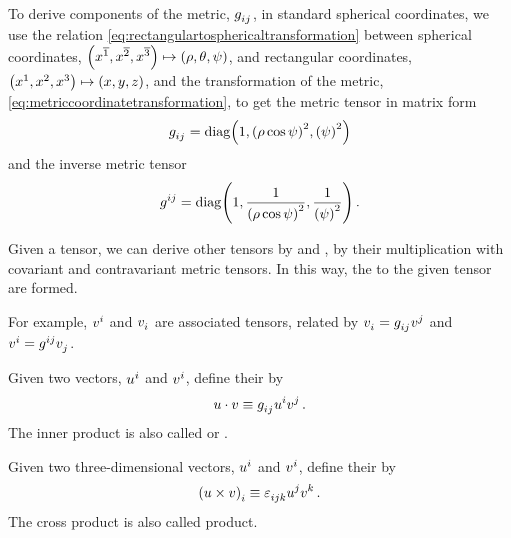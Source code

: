 \begin{example}
  To derive components of the metric, $\tcovmet ij$, in standard spherical coordinates, we use the relation \cref{eq:rectangulartosphericaltransformation} between spherical coordinates, $\tuple{\atvec\pos 1, \atvec\pos 2, \atvec\pos 3}\mapsto \tuple{\sxpos,\sypos,\szpos}$, and rectangular coordinates, $\tuple{\tvec\pos 1, \tvec\pos 2, \tvec\pos 3}\mapsto\tuple{\xpos,\ypos,\zpos}$, and the transformation of the metric, \cref{eq:metriccoordinatetransformation}, to get the metric tensor in matrix form
  \begin{equation}\label{eq:sphericalcoordinatemetric}
    \tcovmet ij = \diag\parens{1, \parens{\sxpos\cos\szpos}^2, \parens{\szpos}^2}
  \end{equation}
  and the inverse metric tensor
  \begin{equation}\label{eq:sphericalcoordinateinversemetric}
    \tvecmet ij = \diag\parens{1, \dfrac{1}{\parens{\sxpos\cos\szpos}^2}, \dfrac{1}{\parens{\szpos}^2}} \,.
  \end{equation}
\end{example}

\begin{definition}
  Given a tensor, we can derive other tensors by  and , by their multiplication with covariant and contravariant metric tensors. In this way, the  to the given tensor are formed.
\end{definition}

\begin{example}
  For example, $\tvec vi$ and $\tcov vi$ are associated tensors, related by $\tcov vi = \tcovmet ij\tvec vj$ and $\tvec vi = \tvecmet ij\tcov vj$.
\end{example}

\begin{definition}
  Given two vectors, $\tvec ui$ and $\tvec vi$, define their  by
  \begin{equation*}
    u\iprod v \defas \tcovmet ij\tvec ui\tvec vj\,.
  \end{equation*}
  The inner product is also called  or .
\end{definition}

\begin{definition}
  Given two three-dimensional vectors, $\tvec ui$ and $\tvec vi$, define their  by
  \begin{equation*}
    \tcov{\parens{u\cprod v}}i \defas \tlevi ijk\tvec uj\tvec vk\,.
  \end{equation*}
  The cross product is also called  product.
\end{definition}

